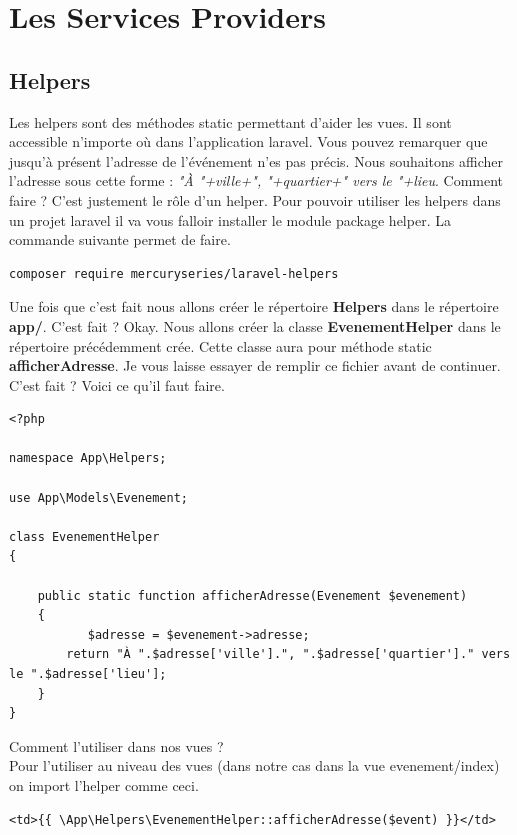 \documentclass[12pt,a4paper]{article}
\begin{document}
\section{Les Services Providers}

\subsection{Helpers}
Les helpers sont des méthodes static permettant d'aider les vues. Il sont accessible n'importe où dans
l'application laravel.
Vous pouvez remarquer que jusqu’à  présent l'adresse de l'événement n'es pas précis.
Nous souhaitons afficher l'adresse sous cette forme : \textit{"À "+ville+", "+quartier+" vers le "+lieu}. Comment faire ? C'est justement le rôle d'un helper.
Pour pouvoir utiliser les helpers dans un projet laravel il va vous falloir installer le module package 
helper. La commande suivante permet de faire.
\begin{verbatim}
composer require mercuryseries/laravel-helpers
\end{verbatim}
Une fois que c'est fait nous allons créer le répertoire \textbf{Helpers} dans le répertoire
\textbf{app/}. C'est fait ? Okay. Nous allons créer la classe \textbf{EvenementHelper} dans le répertoire précédemment crée.  Cette classe aura pour méthode static \textbf{afficherAdresse}.
Je vous laisse essayer de remplir ce fichier avant de continuer. C'est fait ? Voici ce qu'il faut faire.

\begin{verbatim}
<?php

namespace App\Helpers;

use App\Models\Evenement;

class EvenementHelper
{
    
    public static function afficherAdresse(Evenement $evenement)
    {
    	   $adresse = $evenement->adresse;
        return "À ".$adresse['ville'].", ".$adresse['quartier']." vers le ".$adresse['lieu'];
    }
}
\end{verbatim}

Comment l'utiliser dans nos vues ?\\
Pour l'utiliser au niveau des vues (dans notre cas dans la vue evenement/index) on import l'helper comme
ceci.
\begin{verbatim}
<td>{{ \App\Helpers\EvenementHelper::afficherAdresse($event) }}</td>
\end{verbatim}
\end{document}
